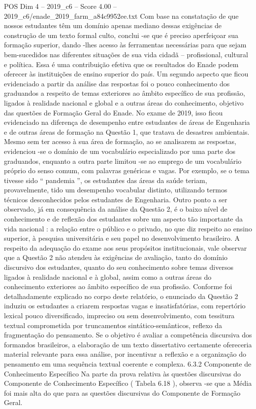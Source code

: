 \begin{textsample}{POS Dim 4 – 2019\_c6 – Score 4.00 – 2019\_c6/enade\_2019\_farm\_a84c9952ee.txt}
Com base na constatação de que nossos estudantes têm um domínio apenas mediano dessas exigências de construção de um texto formal culto, conclui -se que é preciso aperfeiçoar sua formação superior, dando -lhes acesso às ferramentas necessárias para que sejam bem-sucedidos nas diferentes situações de sua vida cidadã – profissional, cultural e política.
Essa é uma contribuição efetiva que os resultados do Enade podem oferecer às instituições de ensino superior do país.
Um segundo aspecto que ficou evidenciado a partir da análise das respostas foi o pouco conhecimento dos graduandos a respeito de temas exteriores ao âmbito específico de sua profissão, ligados à realidade nacional e global e a outras áreas do conhecimento, objetivo das questões de Formação Geral do Enade.
No exame de 2019, isso ficou evidenciado na diferença de desempenho entre estudantes de áreas de Engenharia e de outras áreas de formação na Questão 1, que tratava de desastres ambientais.
Mesmo sem ter acesso à sua área de formação, ao se analisarem as respostas, evidenciou -se o domínio de um vocabulário especializado por uma parte dos graduandos, enquanto a outra parte limitou -se ao emprego de um vocabulário próprio do senso comum, com palavras genéricas e vagas.
Por exemplo, se o tema tivesse sido “ pandemia ”, os estudantes das áreas da saúde teriam, provavelmente, tido um desempenho vocabular distinto, utilizando termos técnicos desconhecidos pelos estudantes de Engenharia.
Outro ponto a ser observado, já em consequência da análise da Questão 2, é o baixo nível de conhecimento e de reflexão dos estudantes sobre um aspecto tão importante da vida nacional : a relação entre o público e o privado, no que diz respeito ao ensino superior, à pesquisa universitária e seu papel no desenvolvimento brasileiro.
A respeito da adequação do exame aos seus propósitos institucionais, vale observar que a Questão 2 não atendeu às exigências de avaliação, tanto do domínio discursivo dos estudantes, quanto do seu conhecimento sobre temas diversos ligados à realidade nacional e à global, assim como a outras áreas do conhecimento exteriores ao âmbito específico de sua profissão.
Conforme foi detalhadamente explicado no corpo deste relatório, o enunciado da Questão 2 induziu os estudantes a criarem respostas vagas e insatisfatórias, com repertório lexical pouco diversificado, impreciso ou sem desenvolvimento, com tessitura textual comprometida por truncamentos sintático-semânticos, reflexo da fragmentação do pensamento.
Se o objetivo é avaliar a competência discursiva dos formandos brasileiros, a elaboração de um texto dissertativo certamente ofereceria material relevante para essa análise, por incentivar a reflexão e a organização do pensamento em uma sequência textual coerente e complexa. 6.3.2 Componente de Conhecimento Específico Na parte da prova relativa às questões discursivas do Componente de Conhecimento Específico ( Tabela 6.18 ), observa -se que a Média foi mais alta do que para as questões discursivas do Componente de Formação Geral.

\end{textsample}

